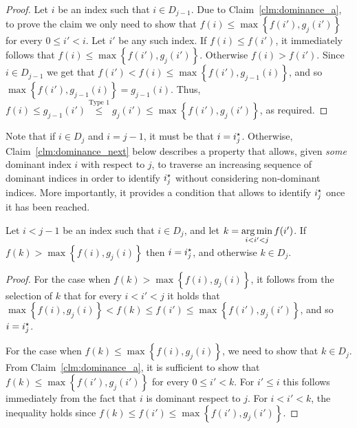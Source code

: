 \begin{proof}
	Let $i$ be an index such that $i \in D_{j-1}$. Due to Claim~\ref{clm:dominance_a}, to prove the claim we only need to show that $f(i) \leq \max\left\{f(i'), g_j(i')\right\}$ for every $0 \leq i' < i$.
	Let $i'$ be any such index.
	If $f(i) \leq f(i')$, it immediately follows that $f(i) \leq \max\left\{f(i'), g_j(i')\right\}$.
	Otherwise  $f(i) > f(i')$. Since $i \in D_{j-1}$ we get that $f(i') < f(i) \leq \max\left\{f(i'), g_{j-1}(i)\right\}$, and so $\max\left\{f(i'), g_{j-1}(i)\right\} = g_{j-1}(i)$. Thus, $f(i) \leq g_{j-1}(i') \stackrel{\text{Type 1}}{\leq} g_j(i') \leq \max\left\{f(i'), g_j(i')\right\}$, as required.
\end{proof}


Note that if $i \in D_j$ and $i = j-1$, it must be that $i = i^\star_{j}$. Otherwise, Claim~\ref{clm:dominance_next} below describes a property that allows, given \emph{some} dominant index $i$ with respect to $j$, to traverse an increasing sequence of dominant indices in order to identify $i^\star_{j}$ without considering non-dominant indices. More importantly, it provides a condition that allows to identify $i^\star_{j}$ once it has been reached.

\begin{claim}
	\label{clm:dominance_next}
	Let $i < j-1$ be an index such that $i \in D_j$, and let $k = \operatorname*{arg\,min}\limits_{i < i' < j} f(i')$. 
	If $f(k) > \max\left\{f(i), g_j(i)\right\}$ then $i = i^\star_{j}$, and otherwise $k \in D_j$.
\end{claim}

\begin{proof}
	For the case when $f(k) > \max\left\{f(i), g_j(i)\right\}$, it follows from the selection of $k$ that for every $i < i' < j$ it holds that $\max\left\{f(i), g_j(i)\right\} < f(k) \leq f(i') \leq \max\left\{f(i'), g_j(i')\right\}$, and so $i = i^\star_{j}$.
	
	For the case when $f(k) \leq \max\left\{f(i), g_j(i)\right\}$, we need to show that $k \in D_j$. From Claim~\ref{clm:dominance_a}, it is sufficient to show that $f(k) \leq \max\left\{f(i'), g_j(i')\right\}$ for every $0 \leq i' < k$. For $i' \leq i$ this follows immediately from the fact that $i$ is dominant respect to $j$. For $i < i' < k$, the inequality holds since $f(k) \leq f(i') \leq \max\left\{f(i'), g_j(i')\right\}$.
\end{proof}

